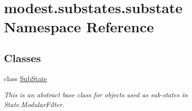 \hypertarget{namespacemodest_1_1substates_1_1substate}{}\section{modest.\+substates.\+substate Namespace Reference}
\label{namespacemodest_1_1substates_1_1substate}
\subsection*{Classes}
\begin{DoxyCompactItemize}
\item 
class \hyperlink{classmodest_1_1substates_1_1substate_1_1SubState}{Sub\+State}
\begin{DoxyCompactList}\small\item\em This is an abstract base class for objects used as sub-\/states in State.\+Modular\+Filter. \end{DoxyCompactList}\end{DoxyCompactItemize}
